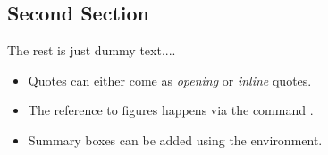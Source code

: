 \begin{multicols}{2}
\section{Second Section}

The rest is just dummy text....

\lipsum[1]

\begin{tcolorbox}[arc=0pt,outer arc=0pt,breakable,title = Summary,
colback=clrt2!30,colframe=clrt2,pad at break=3mm,boxrule=1pt]
   \begin{itemize}[leftmargin=1em]
   \setlength{\itemsep}{0em}
    \item{Quotes can either come as \textit{opening} or \textit{inline} quotes.}
    \item{The reference to figures happens via the command .}
    \item{Summary boxes can be added using the  environment.}
\end{itemize}
\end{tcolorbox}

\end{multicols}
